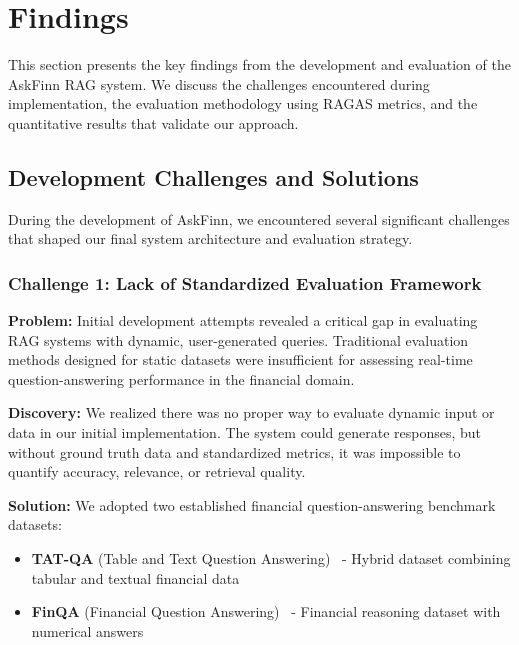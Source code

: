 \section{Findings}
\label{sec:Findings}

This section presents the key findings from the development and evaluation of the AskFinn RAG system. We discuss the challenges encountered during implementation, the evaluation methodology using RAGAS metrics, and the quantitative results that validate our approach.

\subsection{Development Challenges and Solutions}
\label{subsec:challenges}

During the development of AskFinn, we encountered several significant challenges that shaped our final system architecture and evaluation strategy.

\subsubsection{Challenge 1: Lack of Standardized Evaluation Framework}

\textbf{Problem:} Initial development attempts revealed a critical gap in evaluating RAG systems with dynamic, user-generated queries. Traditional evaluation methods designed for static datasets were insufficient for assessing real-time question-answering performance in the financial domain.

\textbf{Discovery:} We realized there was no proper way to evaluate dynamic input or data in our initial implementation. The system could generate responses, but without ground truth data and standardized metrics, it was impossible to quantify accuracy, relevance, or retrieval quality.

\textbf{Solution:} We adopted two established financial question-answering benchmark datasets:
\begin{itemize}
    \item \textbf{TAT-QA} (Table and Text Question Answering)~\cite{tatqa} - Hybrid dataset combining tabular and textual financial data
    \item \textbf{FinQA} (Financial Question Answering)~\cite{finqa} - Financial reasoning dataset with numerical answers
\end{itemize}

